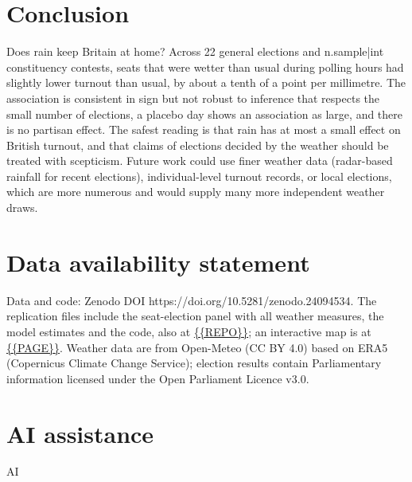 \documentclass[11pt,a4paper]{article}
\begin{document}
\section{Conclusion}\label{sec:concl}
Does rain keep Britain at home? Across 22 general elections and {{n.sample|int}} constituency contests, seats that were wetter than usual during polling hours had slightly lower turnout than usual, by about a tenth of a point per millimetre. The association is consistent in sign but not robust to inference that respects the small number of elections, a placebo day shows an association as large, and there is no partisan effect. The safest reading is that rain has at most a small effect on British turnout, and that claims of elections decided by the weather should be treated with scepticism. Future work could use finer weather data (radar-based rainfall for recent elections), individual-level turnout records, or local elections, which are more numerous and would supply many more independent weather draws.

\section*{Data availability statement}
Data and code: Zenodo DOI https://doi.org/10.5281/zenodo.24094534. The replication files include the seat-election panel with all weather measures, the model estimates and the code, also at \url{{{REPO}}}; an interactive map is at \url{{{PAGE}}}. Weather data are from Open-Meteo (CC BY 4.0) based on ERA5 (Copernicus Climate Change Service); election results contain Parliamentary information licensed under the Open Parliament Licence v3.0.

\section*{AI assistance}
{{AI}}
\end{document}
